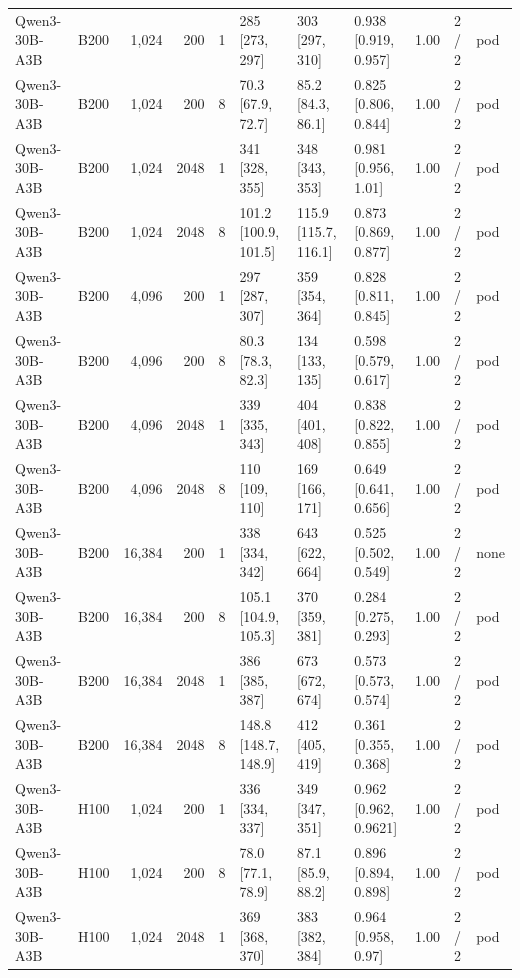 \begin{landscape}
\begin{longtable}{llrrrlllrll}
Qwen3-30B-A3B & B200 & 1,024 & 200 & 1 & 285 {[}273, 297{]} & 303 {[}297, 310{]} & 0.938 {[}0.919, 0.957{]} & 1.00 & 2 / 2 & pod \\
Qwen3-30B-A3B & B200 & 1,024 & 200 & 8 & 70.3 {[}67.9, 72.7{]} & 85.2 {[}84.3, 86.1{]} & 0.825 {[}0.806, 0.844{]} & 1.00 & 2 / 2 & pod \\
Qwen3-30B-A3B & B200 & 1,024 & 2048 & 1 & 341 {[}328, 355{]} & 348 {[}343, 353{]} & 0.981 {[}0.956, 1.01{]} & 1.00 & 2 / 2 & pod \\
Qwen3-30B-A3B & B200 & 1,024 & 2048 & 8 & 101.2 {[}100.9, 101.5{]} & 115.9 {[}115.7, 116.1{]} & 0.873 {[}0.869, 0.877{]} & 1.00 & 2 / 2 & pod \\
Qwen3-30B-A3B & B200 & 4,096 & 200 & 1 & 297 {[}287, 307{]} & 359 {[}354, 364{]} & 0.828 {[}0.811, 0.845{]} & 1.00 & 2 / 2 & pod \\
Qwen3-30B-A3B & B200 & 4,096 & 200 & 8 & 80.3 {[}78.3, 82.3{]} & 134 {[}133, 135{]} & 0.598 {[}0.579, 0.617{]} & 1.00 & 2 / 2 & pod \\
Qwen3-30B-A3B & B200 & 4,096 & 2048 & 1 & 339 {[}335, 343{]} & 404 {[}401, 408{]} & 0.838 {[}0.822, 0.855{]} & 1.00 & 2 / 2 & pod \\
Qwen3-30B-A3B & B200 & 4,096 & 2048 & 8 & 110 {[}109, 110{]} & 169 {[}166, 171{]} & 0.649 {[}0.641, 0.656{]} & 1.00 & 2 / 2 & pod \\
Qwen3-30B-A3B & B200 & 16,384 & 200 & 1 & 338 {[}334, 342{]} & 643 {[}622, 664{]} & 0.525 {[}0.502, 0.549{]} & 1.00 & 2 / 2 & none \\
Qwen3-30B-A3B & B200 & 16,384 & 200 & 8 & 105.1 {[}104.9, 105.3{]} & 370 {[}359, 381{]} & 0.284 {[}0.275, 0.293{]} & 1.00 & 2 / 2 & pod \\
Qwen3-30B-A3B & B200 & 16,384 & 2048 & 1 & 386 {[}385, 387{]} & 673 {[}672, 674{]} & 0.573 {[}0.573, 0.574{]} & 1.00 & 2 / 2 & pod \\
Qwen3-30B-A3B & B200 & 16,384 & 2048 & 8 & 148.8 {[}148.7, 148.9{]} & 412 {[}405, 419{]} & 0.361 {[}0.355, 0.368{]} & 1.00 & 2 / 2 & pod \\
Qwen3-30B-A3B & H100 & 1,024 & 200 & 1 & 336 {[}334, 337{]} & 349 {[}347, 351{]} & 0.962 {[}0.962, 0.9621{]} & 1.00 & 2 / 2 & pod \\
Qwen3-30B-A3B & H100 & 1,024 & 200 & 8 & 78.0 {[}77.1, 78.9{]} & 87.1 {[}85.9, 88.2{]} & 0.896 {[}0.894, 0.898{]} & 1.00 & 2 / 2 & pod \\
Qwen3-30B-A3B & H100 & 1,024 & 2048 & 1 & 369 {[}368, 370{]} & 383 {[}382, 384{]} & 0.964 {[}0.958, 0.97{]} & 1.00 & 2 / 2 & pod \\

\end{longtable}
\end{landscape}
